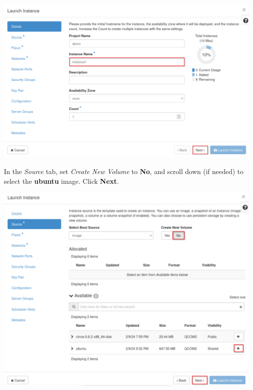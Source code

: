 \documentclass[letterpaper, 12pt]{article}
\begin{document}
\begin{enumerate}
\begin{labstep}
        \begin{center}
            \includegraphics[width=\linewidth]{images/part2/step11.png}
        \end{center}
    \end{labstep}

    \begin{labstep}
        In the \textit{Source} tab, set \textit{Create New Volume} to \textbf{No}, and scroll down (if needed) to select the \textbf{ubuntu} image.
        Click \textbf{Next}.

        \begin{center}
            \includegraphics[width=\linewidth]{images/part2/step12.png}
        \end{center}
    \end{labstep}


\end{enumerate}
\end{document}
